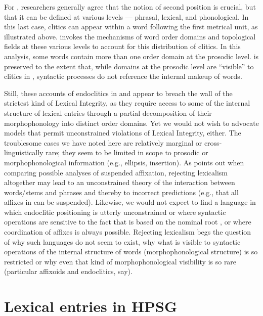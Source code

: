 \documentclass[output=paper,biblatex,babelshorthands,newtxmath,draftmode,colorlinks,citecolor=brown]{langscibook}
\begin{document}
For , researchers generally agree that the notion of second position is crucial, but that it
can be defined at various levels --- phrasal, lexical, and phonological. In this last case, clitics
can appear within a word following the first metrical unit, as illustrated above.
\citet{Dost2007} invokes the mechanisms of word order domains \citep{Reape1994} and topological fields \citep{Kathol2000a} at these various levels to account for this distribution of clitics. In this analysis, some words contain more than one order domain at the prosodic level.  is preserved to the extent that, while domains at the prosodic level are ``visible'' to clitics in , syntactic processes do not reference the internal makeup of words.

Still, these accounts of endoclitics in  and  appear to breach the wall of the strictest kind of Lexical Integrity, as they require access to some of the internal structure of lexical entries through a partial decomposition of their morphophonology into distinct order domains. Yet we would not wish to advocate models that permit unconstrained violations of Lexical Integrity, either. The troublesome cases we have noted here are relatively marginal or cross-linguistically rare; they seem to be limited in scope to prosodic or morphophonological information (e.g., ellipsis, insertion). As \citet{Broadwell2008} points out when comparing possible analyses of  suspended affixation, rejecting lexicalism altogether may lead to an unconstrained theory of the interaction between words/stems and phrases and thereby to incorrect predictions (e.g., that all affixes in  can be suspended). Likewise, we would not expect to find a language in which endoclitic positioning is utterly unconstrained or where syntactic operations are sensitive to the fact that  is based on the nominal root , or where coordination of affixes is always possible. Rejecting lexicalism begs the question of why such languages do not seem to exist, why what is visible to syntactic operations of the internal structure of words (morphophonological structure) is so restricted or why even that kind of morphophonological visibility is so rare (particular affixoids and endoclitics, say).

\section{Lexical entries in HPSG}
\end{document}
